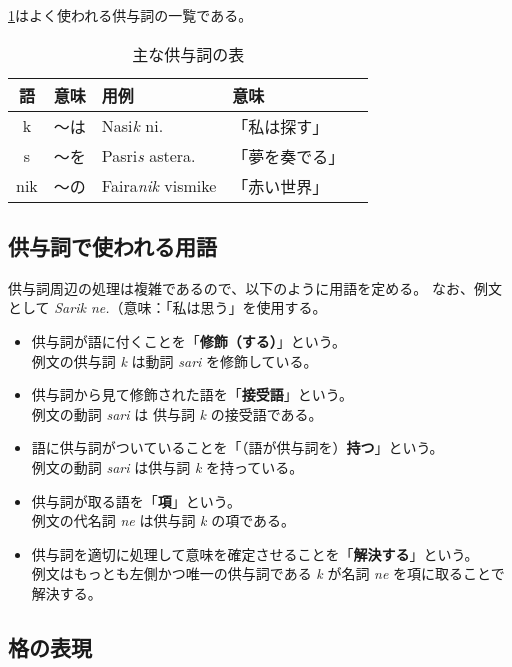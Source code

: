 \cref{table:common-sups}はよく使われる供与詞の一覧である。

\begin{table}[H]
    \centering
    \caption{主な供与詞の表}
    \label{table:common-sups}
    \begin{tabular}{cclll}
        \toprule
        語 & 意味 & 用例 & 意味 \\
        \midrule
        k   & ～は & Nasi\emph{k} ni.     & 「私は探す」\\
        s   & ～を & Pasri\emph{s} astera. & 「夢を奏でる」\\
        nik & ～の & Faira\emph{nik} vismike & 「赤い世界」\\
        \bottomrule
    \end{tabular}
\end{table}

\subsection{供与詞で使われる用語}

供与詞周辺の処理は複雑であるので、以下のように用語を定める。
なお、例文として \emph{Sarik ne.}（意味：「私は思う」を使用する。

\begin{itemize}
    \item 供与詞が語に付くことを「\textbf{修飾（する）}」という。 \\ 例文の供与詞 \emph{k} は動詞 \emph{sari} を修飾している。
    \item 供与詞から見て修飾された語を「\textbf{接受語}」という。\\ 例文の動詞 \emph{sari} は 供与詞 \emph{k} の接受語である。
    \item 語に供与詞がついていることを「（語が供与詞を）\textbf{持つ}」という。 \\ 例文の動詞 \emph{sari} は供与詞 \emph{k} を持っている。
    \item 供与詞が取る語を「\textbf{項}」という。 \\ 例文の代名詞 \emph{ne} は供与詞 \emph{k} の項である。
    \item 供与詞を適切に処理して意味を確定させることを「\textbf{解決する}」という。 \\例文はもっとも左側かつ唯一の供与詞である \emph{k} が名詞 \emph{ne} を項に取ることで解決する。
\end{itemize}

\subsection{格の表現}

